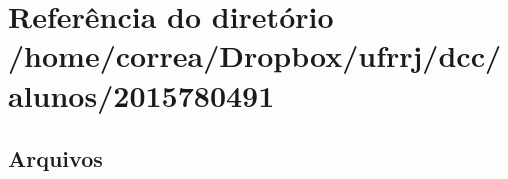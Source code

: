 \section{Referência do diretório /home/correa/\+Dropbox/ufrrj/dcc/alunos/2015780491}
\label{dir_41b663e6fc23fd1ba46f34be10303b2b}
\subsection*{Arquivos}
\begin{DoxyCompactItemize}
\end{DoxyCompactItemize}
